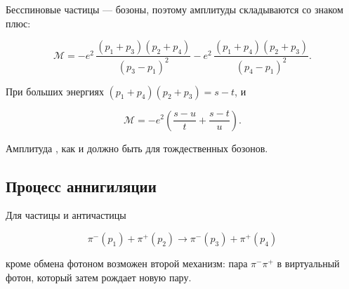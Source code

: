 \documentclass[../final.tex]{subfiles}
\begin{document}
Бесспиновые частицы --- бозоны, поэтому амплитуды складываются
со знаком плюс:

\begin{equation*}
    \mathcal M
    =
    -e^2\,
    \frac{\left(p_1+p_3\right)\left(p_2+p_4\right)}
         {\left(p_3-p_1\right)^2}
    -e^2\,
    \frac{\left(p_1+p_4\right)\left(p_2+p_3\right)}
         {\left(p_4-p_1\right)^2}.
\end{equation*}

При больших энергиях
$(p_1+p_4)(p_2+p_3)=s-t$, и

\begin{equation*}
    \mathcal M
    =
    -e^2
    \left(
        \frac{s-u}{t}
        +
        \frac{s-t}{u}
    \right).
\end{equation*}

Амплитуда ,
как и должно быть для тождественных бозонов.


\subsection{Процесс аннигиляции}

Для частицы и античастицы

\begin{equation*}
    \pi^-(p_1)+\pi^+(p_2)\rightarrow\pi^-(p_3)+\pi^+(p_4)
\end{equation*}

кроме обмена фотоном возможен второй механизм: пара
$\pi^-\pi^+$  в виртуальный фотон,
который затем рождает новую пару.
\end{document}
